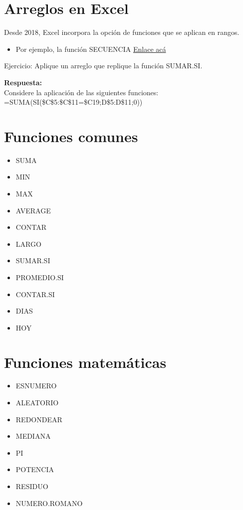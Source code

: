 \documentclass[12 pt,letterpaper]{article}
\newenvironment{solution}
{\begin{mdframed} \textbf{Respuesta:} \ \\}
	{\end{mdframed}}
\begin{document}
\section{Arreglos en Excel}

Desde 2018, Excel incorpora la opción de funciones que se aplican en rangos.

\begin{itemize}
	\item 	Por ejemplo, la función SECUENCIA \href{https://support.microsoft.com/es-es/office/función-secuencia-57467a98-57e0-4817-9f14-2eb78519ca90}{Enlace acá} 
\end{itemize}

\noindent
{\Huge \faBell} Ejercicio: Aplique un arreglo que replique la función SUMAR.SI.

\begin{solution}
Considere la aplicación de las siguientes funciones:\\

=SUMA(SI(\$C\$5:\$C\$11=\$C19;D\$5:D\$11;0))
\end{solution}

\section{Funciones comunes}

\begin{itemize}
	\item SUMA
	\item MIN
	\item MAX
	\item AVERAGE
	\item CONTAR
	\item LARGO
	\item SUMAR.SI
	\item PROMEDIO.SI
	\item CONTAR.SI
	\item DIAS
	\item HOY
\end{itemize}

\section{Funciones matemáticas}

\begin{itemize}
	\item ESNUMERO
	\item ALEATORIO
	\item REDONDEAR
	\item MEDIANA
	\item PI
	\item POTENCIA
	\item RESIDUO
	\item NUMERO.ROMANO
\end{itemize}
\end{document}
